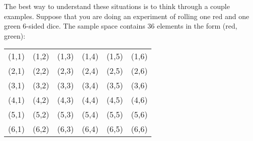 \documentclass{ximera}
\begin{document}
The best way to understand these situations is to think through a couple examples. Suppose that you are doing an experiment of rolling one red and one green 6-sided dice. The sample space contains 36 elements in the form (red, green):
\begin{image} \begin{tabular}{cccccc}
    (1,1) & (1,2) & (1,3) & (1,4) & (1,5) & (1,6) \\
    (2,1) & (2,2) & (2,3) & (2,4) & (2,5) & (2,6) \\
    (3,1) & (3,2) & (3,3) & (3,4) & (3,5) & (3,6) \\
    (4,1) & (4,2) & (4,3) & (4,4) & (4,5) & (4,6) \\
    (5,1) & (5,2) & (5,3) & (5,4) & (5,5) & (5,6) \\
    (6,1) & (6,2) & (6,3) & (6,4) & (6,5) & (6,6) \\
\end{tabular} \end{image}
\end{document}
